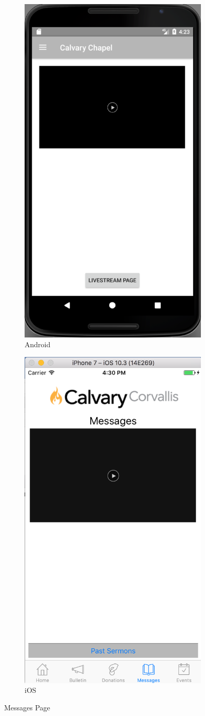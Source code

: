 \documentclass[letterpaper,10pt,draftclsnofoot,onecolumn,titlepage]{IEEEtran}
\begin{document}
		\begin{figure}[H]
			\centering
			\begin{subfigure}{.5\textwidth}
 				 \centering
  				 \includegraphics[width=.4\linewidth]{androidmessages}
 				 \caption{Android}
  				 \label{fig:sub1}
			\end{subfigure}%
			\begin{subfigure}{.5\textwidth}
		         	\centering
 				 \includegraphics[width=.4\linewidth]{iosmessages}
 				 \caption{iOS}
 				 \label{fig:sub2}
			\end{subfigure}
			\caption{Messages Page}
			\label{fig:message}
		\end{figure}
\end{document}
